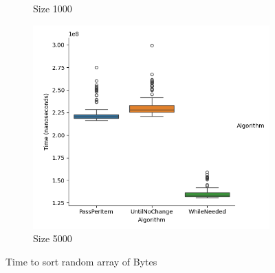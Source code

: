 \documentclass{article}
\begin{document}
\begin{figure}[ht]
\begin{subfigure}{0.3\textwidth}
    \caption{Size 1000}
    \label{fig:img2}
  \end{subfigure}
  \begin{subfigure}{0.3\textwidth}
    \centering
    \includegraphics[width=\linewidth]{../figureByteRandom5000.png}
    \caption{Size 5000}
    \label{fig:img3}
  \end{subfigure}
  \caption{Time to sort random array of Bytes}
  \label{fig:three_images}
\end{figure}
\end{document}
